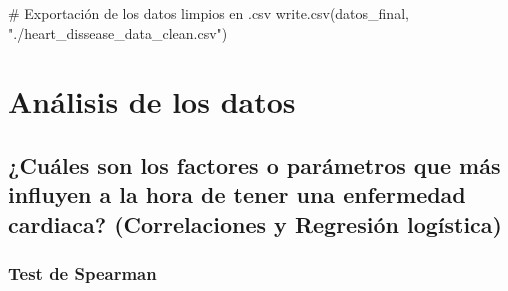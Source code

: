 \documentclass[
]{article}
\newenvironment{Shaded}{\begin{snugshade}}{\end{snugshade}}
\newcommand{\CommentTok}[1]{\textcolor[rgb]{0.50,0.62,0.50}{#1}}
\newcommand{\FunctionTok}[1]{\textcolor[rgb]{0.94,0.94,0.56}{#1}}
\newcommand{\NormalTok}[1]{\textcolor[rgb]{0.80,0.80,0.80}{#1}}
\newcommand{\StringTok}[1]{\textcolor[rgb]{0.80,0.58,0.58}{#1}}
\begin{document}
\begin{Shaded}
\begin{Highlighting}[]
\CommentTok{\# Exportación de los datos limpios en .csv}
\FunctionTok{write.csv}\NormalTok{(datos\_final, }\StringTok{"./heart\_dissease\_data\_clean.csv"}\NormalTok{)}
\end{Highlighting}
\end{Shaded}

\hypertarget{anuxe1lisis-de-los-datos}{%
\section{Análisis de los datos}\label{anuxe1lisis-de-los-datos}}

\hypertarget{cuuxe1les-son-los-factores-o-paruxe1metros-que-muxe1s-influyen-a-la-hora-de-tener-una-enfermedad-cardiaca-correlaciones-y-regresiuxf3n-loguxedstica}{%
\subsection{¿Cuáles son los factores o parámetros que más influyen a la
hora de tener una enfermedad cardiaca? (Correlaciones y Regresión
logística)}\label{cuuxe1les-son-los-factores-o-paruxe1metros-que-muxe1s-influyen-a-la-hora-de-tener-una-enfermedad-cardiaca-correlaciones-y-regresiuxf3n-loguxedstica}}

\hypertarget{test-de-spearman}{%
\subsubsection{Test de Spearman}\label{test-de-spearman}}
\end{document}
